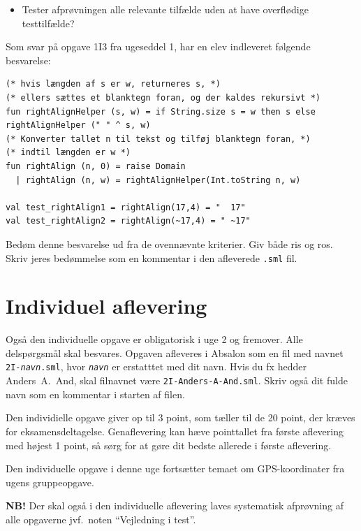 \documentclass[a4paper,12pt]{article}
\begin{document}
\begin{enumerate}[{2}G1]
\begin{itemize}
\item Tester afprøvningen alle relevante tilfælde uden at have
  overflødige testtilfælde?
\end{itemize}

Som svar på opgave 1I3 fra ugeseddel 1, har en elev indleveret
følgende besvarelse:
{\footnotesize
\begin{Verbatim}
(* hvis længden af s er w, returneres s, *)
(* ellers sættes et blanktegn foran, og der kaldes rekursivt *)
fun rightAlignHelper (s, w) = if String.size s = w then s else rightAlignHelper (" " ^ s, w)
(* Konverter tallet n til tekst og tilføj blanktegn foran, *)
(* indtil længden er w *)
fun rightAlign (n, 0) = raise Domain
  | rightAlign (n, w) = rightAlignHelper(Int.toString n, w)

val test_rightAlign1 = rightAlign(17,4) = "  17"
val test_rightAlign2 = rightAlign(~17,4) = " ~17"
\end{Verbatim}
}

Bedøm denne besvarelse ud fra de ovennævnte kriterier.  Giv både ris
og ros.  Skriv jeres bedømmelse som en kommentar i den afleverede
\verb|.sml| fil.

\end{enumerate}

\section{Individuel aflevering}
\label{sec:indiv-aflev}

Også den individuelle opgave er obligatorisk i uge 2 og fremover.
Alle delspørgsmål skal besvares.  Opgaven afleveres i Absalon som en
fil med navnet \texttt{2I-\textit{navn}.sml}, hvor
\texttt{\textit{navn}} er erstatttet med dit navn. Hvis du fx hedder
Anders~A.~And, skal filnavnet være \texttt{2I-Anders-A-And.sml}. Skriv
også dit fulde navn som en kommentar i starten af filen.

Den individielle opgave giver op til 3 point, som tæller til de 20
point, der kræves for eksamensdeltagelse.  Genaflevering kan hæve
pointtallet fra første aflevering med højest 1 point, så sørg for at
gøre dit bedste allerede i første aflevering.

Den individuelle opgave i denne uge fortsætter temaet om
GPS-koordinater fra ugens gruppeopgave.

\textbf{NB!} Der skal også i den individuelle aflevering laves
systematisk afprøvning af alle opgaverne jvf.\ noten ``Vejledning i
test''.
\end{document}

